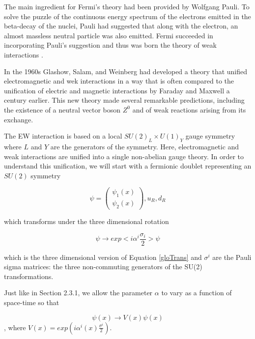 The main ingredient for Fermi's theory had been provided by Wolfgang Pauli. To solve the puzzle of the continuous energy spectrum of the electrons emitted in the beta-decay of the nuclei, Pauli had suggested that along with the electron, an almost massless neutral particle was also emitted. Fermi succeeded in incorporating Pauli's suggestion and thus was born the theory of weak interactions \cite{Rajasekaran:2014vza}.

In the 1960s Glashow, Salam, and Weinberg had developed a theory\cite{Glashow:1961tr,PhysRevLett.19.1264,salam} that unified electromagnetic and wek interactions in a way that is often compared to the unification of electric and magnetic interactions by Faraday and Maxwell a century earlier. This new theory made several remarkable predictions, including the existence of a neutral vector boson $Z^{0}$ and of weak reactions arising from its exchange.

The EW interaction is based on a local $SU(2)_{L}\times U(1)_{Y}$ gauge symmetry where $L$ and $Y$ are the generators of the symmetry. Here, electromagnetic and weak interactions are unified into a single non-abelian gauge theory. In order to understand this unification, we will start with a fermionic doublet representing an $SU(2)$ symmetry

\begin{equation}
\psi = \begin{pmatrix}
	\psi_{1}(x) \\
	\psi_{2}(x)
\end{pmatrix}, u_{R}, d_{R}
\end{equation}

which transforms under the three dimensional rotation

\begin{equation}
\psi\rightarrow exp<i\alpha^{i}\frac{\sigma_{i}}{2}>\psi
\end{equation}

which is the three dimensional version of Equation \ref{gloTrans} and $\sigma^{i}$ are the Pauli sigma matrices: the three non-commuting generators of the SU(2) transformations.

Just like in Section 2.3.1, we allow the parameter $\alpha$ to vary as a function of space-time so that

\begin{equation}
\psi(x)\rightarrow V(x)\psi(x)
\end{equation}
, where $V(x)= exp(i\alpha^{i}(x)\frac{\sigma^{i}}{2})$.

